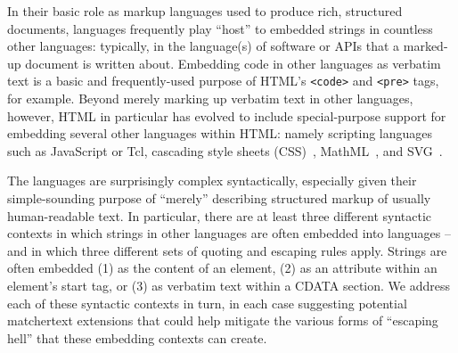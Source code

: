 In their basic role as markup languages
used to produce rich, structured documents,
\ml languages frequently play ``host'' to embedded strings
in countless other languages:
typically, in the language(s) of software or APIs
that a marked-up document is written about.
Embedding code in other languages as verbatim text
is a basic and frequently-used purpose of HTML's
\verb|<code>| and \verb|<pre>| tags,
for example.
Beyond merely marking up verbatim text in other languages, however,
HTML in particular has evolved to include special-purpose support
for embedding several other languages within HTML:
namely scripting languages such as JavaScript or Tcl,
cascading style sheets (CSS)~\cite{w3c21css},
MathML~\cite{w3c14mathml},
and SVG~\cite{w3c18svg}.

The \ml languages are surprisingly complex syntactically,
especially given their simple-sounding purpose
of ``merely'' describing structured markup of usually human-readable text.
In particular,
there are at least three different syntactic contexts
in which strings in other languages are often embedded
into \ml languages --
and in which three different sets of quoting and escaping rules apply.
Strings are often embedded
(1) as the content of an element,
(2) as an attribute within an element's start tag, or
(3) as verbatim text within a CDATA section.
We address each of these syntactic contexts in turn,
in each case suggesting potential matchertext extensions
that could help mitigate the various forms of ``escaping hell''
that these embedding contexts can create.

